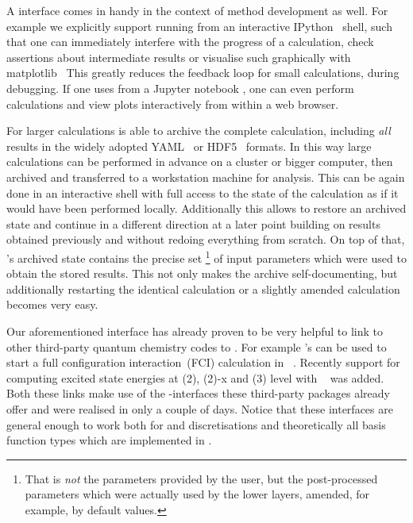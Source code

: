 A \python interface comes in handy in the context of method development as well.
For example we explicitly support running \molsturm from an interactive
IPython~\cite{IPython} shell,
such that one can immediately interfere with the progress of a calculation,
check assertions about intermediate results
or visualise such graphically with matplotlib~\cite{Matplotlib}
This greatly reduces the feedback loop for small calculations,
\eg during debugging.
If one uses \molsturm from a Jupyter notebook \cite{Jupyter},
one can even perform calculations and view plots
interactively from within a web browser.

For larger calculations \molsturm is able to archive the complete
calculation,
including \emph{all} \SCF results in
the widely adopted YAML~\cite{YAML} or HDF5~\cite{HDF5Manual} formats.
In this way large calculations can be performed in advance
on a cluster or bigger computer,
then archived and transferred to a workstation machine
for analysis.
This can be again done in an interactive shell
with full access to the state of the calculation
as if it would have been performed locally.
Additionally this allows to restore an archived state
and continue in a different direction at a later point
building on results obtained previously
and without redoing everything from scratch.
On top of that, \molsturm's archived state contains
the precise set%
\footnote{That is \emph{not} the parameters provided by the user,
but the post-processed parameters which were actually used
by the lower layers, amended, for example, by default values.}
of input parameters which were used to obtain the stored results.
This not only makes the archive self-documenting,
but additionally restarting the identical calculation
or a slightly amended calculation becomes very easy.

Our aforementioned \numpy interface has already proven to be very helpful
to link to other third-party quantum chemistry codes to \molsturm.
For example \molsturm's \SCF can be used to start a
full configuration interaction~(FCI) calculation
in \pyscf~\cite{Sun2017}.
Recently support for computing excited state energies at {\ADC}(2),
{\ADC}(2)-x and {\ADC}(3) \cite{Schirmer1982,Trofimov1999} level
with \adcman~\cite{Wormit2014} was added.
Both these links make use of the \python-\numpy interfaces
these third-party packages already offer and were realised in only a couple of days.
Notice that these interfaces
are general enough to work both for \CS and \cGTO discretisations
and theoretically all basis function types which are implemented in \gint.

